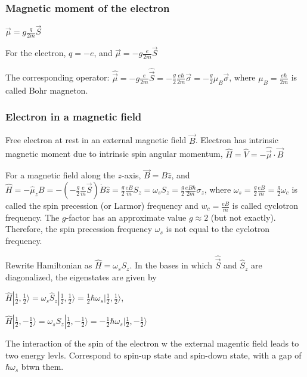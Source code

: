 
\subsubsection{Magnetic moment of the electron}
$\vec{\mu} = g \frac{q}{2m} \vec{S}$

For the electron, $q=-e$, and $\vec{\mu} = -g \frac{e}{2m} \vec{S}$

The corresponding operator: $\widehat{\vec{\mu}} = -g \frac{e}{2m} \widehat{\vec{S}} = -\frac{g}{2} \frac{e \hbar}{2m} \vec{\sigma} = - \frac{g}{2} \mu_B \vec{\sigma}$, where $\mu_B = \frac{e \hbar}{2m}$ is called Bohr magneton.

\subsubsection{Electron in a magnetic field}

Free electron at rest in an external magnetic field $\vec{B}$. Electron has intrinsic magnetic moment due to intrinsic spin angular momentum, $\widehat{H} = \widehat{V} = -\widehat{\vec{\mu}} \cdot \vec{B}$

For a magnetic field along the $z$-axis, $\vec{B} = B \widehat{z}$, and $\widehat{H} = -\widehat{\mu}_z B = -(-\frac{g}{2} \frac{e}{m} \vec{S}) \dot B \widehat{z} = \frac{g}{2} \frac{eB}{m} S_z = \omega_s S_z = \frac{g}{2} \frac{eB\hbar}{2m} \sigma_z$, where $\omega_s = \frac{g}{2} \frac{eB}{m} = \frac{g}{2} \omega_c$ is called the spin precession (or Larmor) frequency and $w_c = \frac{e B}{m}$ is called cyclotron frequency. The $g$-factor has an approximate value $g \approx 2$ (but not exactly). Therefore, the spin precession frequency $\omega_s$ is not equal to the cyclotron frequency. 

Rewrite Hamiltonian as $\widehat{H} = \omega_s S_z$. In the bases in which $\widehat{\vec{S}}$ and $\widehat{S}_z$ are diagonalized, the eigenstates are given by 

$\widehat{H} | \frac{1}{2}, \frac{1}{2} \rangle = \omega_s \widehat{S}_z | \frac{1}{2}, \frac{1}{2} \rangle = \frac{1}{2} \hbar \omega_s | \frac{1}{2}, \frac{1}{2} \rangle$, 

$\widehat{H} | \frac{1}{2}, -\frac{1}{2} \rangle = \omega_s \widehat{S}_z | \frac{1}{2}, -\frac{1}{2} \rangle = - \frac{1}{2} \hbar \omega_s | \frac{1}{2}, -\frac{1}{2} \rangle$

The interaction of the spin of the electron w the external magentic field leads to two energy levls. Correspond to spin-up state and spin-down state, with a gap of $\hbar \omega_s$ btwn them.

